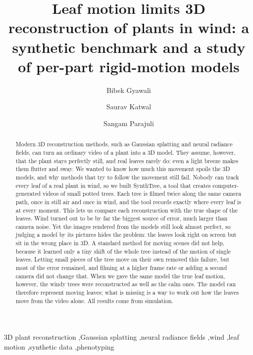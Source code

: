 \documentclass[preprint,11pt,authoryear]{elsarticle}
\begin{document}
\begin{frontmatter}

\title{Leaf motion limits 3D reconstruction of plants in wind: a synthetic benchmark and a study of per-part rigid-motion models}

\author[1]{Bibek Gyawali}
\author[2]{Saurav Katwal}
\author[2]{Sangam Parajuli}

\begin{abstract}
Modern 3D reconstruction methods, such as Gaussian splatting and neural radiance fields, can turn an ordinary video of a plant into a 3D model. They assume, however, that the plant stays perfectly still, and real leaves rarely do: even a light breeze makes them flutter and sway. We wanted to know how much this movement spoils the 3D models, and why methods that try to follow the movement still fail. Nobody can track every leaf of a real plant in wind, so we built SynthTree, a tool that creates computer-generated videos of small potted trees. Each tree is filmed twice along the same camera path, once in still air and once in wind, and the tool records exactly where every leaf is at every moment. This lets us compare each reconstruction with the true shape of the leaves. Wind turned out to be by far the biggest source of error, much larger than camera noise. Yet the images rendered from the models still look almost perfect, so judging a model by its pictures hides the problem: the leaves look right on screen but sit in the wrong place in 3D. A standard method for moving scenes did not help, because it learned only a tiny shift of the whole tree instead of the motion of single leaves. Letting small pieces of the tree move on their own removed this failure, but most of the error remained, and filming at a higher frame rate or adding a second camera did not change that. When we gave the same model the true leaf motion, however, the windy trees were reconstructed as well as the calm ones. The model can therefore represent moving leaves; what is missing is a way to work out how the leaves move from the video alone. All results come from simulation.
\end{abstract}

\begin{keyword}
3D plant reconstruction \sep Gaussian splatting \sep neural radiance fields \sep wind \sep leaf motion \sep synthetic data \sep phenotyping
\end{keyword}
\end{frontmatter}
\end{document}
